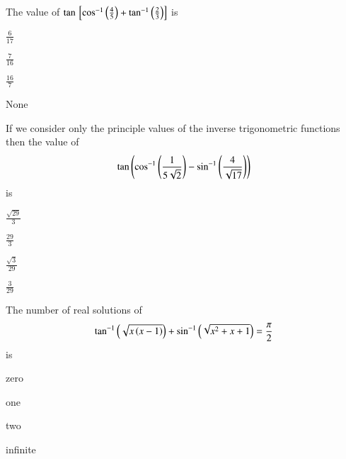 \iffalse
\title{Assignment}
\author{Arjun Pavanje}
\section{mcq-single}
\fi
\item The value of $\tan {}\left[ \cos ^{-1}\left(\frac{4}{5}\right)+\tan^{-1}\left(\frac{2}{3}\right) \right]$ is
\hfill {}
\begin{enumerate}
\begin{multicols}{2}
\item $\frac{6}{17}$
\columnbreak
\item$\frac{7}{16}$
\end{multicols}
\begin{multicols}{2}
\item $\frac{16}{7}$ 
\columnbreak
\item None
\end{multicols}
\end{enumerate}
\item If we consider only the principle values of the inverse trigonometric functions then the value of
\begin{align*}
\tan \left(\cos ^{-1}\left(\frac{1}{5\sqrt{2}}\right)-\sin ^{-1}\left(\frac{4}{\sqrt{17}}\right)\right)
\end{align*}
is
\hfill {}
\begin{enumerate}
\begin{multicols}{2}
\item $\frac{\sqrt{29}}{3}$ 
\columnbreak
\item $\frac{29}{3}$
\end{multicols}
\begin{multicols}{2}
\item $\frac{\sqrt{3}}{29}$ 
\columnbreak
\item $\frac{3}{29}$ 
\end{multicols}
\end{enumerate}
\item The number of real solutions of
\begin{align*}
\tan ^{-1}\left(\sqrt{x\left(x-1\right)}\right)+\sin ^{-1}\left(\sqrt{x^2+x+1}\right)=\frac{\pi}{2}
\end{align*}
is 
\hfill {}
\begin{enumerate}
\begin{multicols}{2}
\item zero 
\columnbreak
\item one 
\end{multicols}
\begin{multicols}{2}
\item two 
\columnbreak
\item infinite
\end{multicols}
\end{enumerate}
